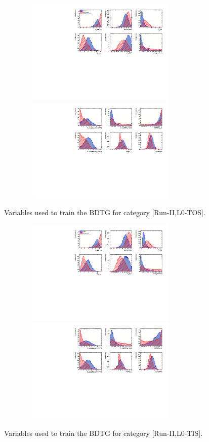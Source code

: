 \begin{figure}[h]
\centering
\includegraphics[height=5cm,width=0.9\textwidth]{figs/TMVA/BDTG_Data_run2_t0_all/variables_id_c1.pdf}
\includegraphics[height=5cm,width=0.9\textwidth]{figs/TMVA/BDTG_Data_run2_t0_all/variables_id_c2.pdf}
\caption{Variables used to train the BDTG for category [Run-II,\textsf{L0-TOS}].}
\label{fig:}
\includegraphics[height=5cm,width=0.9\textwidth]{figs/TMVA/BDTG_Data_run2_t1_all/variables_id_c1.pdf}
\includegraphics[height=5cm,width=0.9\textwidth]{figs/TMVA/BDTG_Data_run2_t1_all/variables_id_c2.pdf}
\caption{Variables used to train the BDTG for category [Run-II,\textsf{L0-TIS}].}
\label{fig:}
\end{figure}


